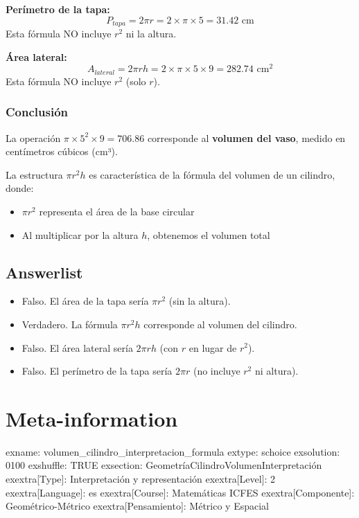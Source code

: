 \documentclass[
]{article}
\providecommand{\tightlist}{%
  \setlength{\itemsep}{0pt}\setlength{\parskip}{0pt}}
\begin{document}
\textbf{Perímetro de la tapa:}
\[P_{tapa} = 2\pi r = 2 \times \pi \times  5  =  31.42  \text{ cm}\]
Esta fórmula NO incluye \(r^2\) ni la altura.

\textbf{Área lateral:}
\[A_{lateral} = 2\pi r h = 2 \times \pi \times  5  \times  9  =  282.74  \text{ cm}^2\]
Esta fórmula NO incluye \(r^2\) (solo \(r\)).

\subsubsection{Conclusión}\label{conclusiuxf3n}

La operación \(\pi \times 5^2 \times 9 = 706.86\) corresponde al
\textbf{volumen del vaso}, medido en centímetros cúbicos (cm³).

La estructura \(\pi r^2 h\) es característica de la fórmula del volumen
de un cilindro, donde:

\begin{itemize}
\tightlist
\item
  \(\pi r^2\) representa el área de la base circular
\item
  Al multiplicar por la altura \(h\), obtenemos el volumen total
\end{itemize}

\subsection{Answerlist}\label{answerlist-1}

\begin{itemize}
\tightlist
\item
  Falso. El área de la tapa sería \(\pi r^2\) (sin la altura).
\item
  Verdadero. La fórmula \(\pi r^2 h\) corresponde al volumen del
  cilindro.
\item
  Falso. El área lateral sería \(2\pi r h\) (con \(r\) en lugar de
  \(r^2\)).
\item
  Falso. El perímetro de la tapa sería \(2\pi r\) (no incluye \(r^2\) ni
  altura).
\end{itemize}

\section{Meta-information}\label{meta-information}

exname: volumen\_cilindro\_interpretacion\_formula extype: schoice
exsolution: 0100 exshuffle: TRUE exsection:
Geometría\textbar Cilindro\textbar Volumen\textbar Interpretación
exextra{[}Type{]}: Interpretación y representación exextra{[}Level{]}: 2
exextra{[}Language{]}: es exextra{[}Course{]}: Matemáticas ICFES
exextra{[}Componente{]}: Geométrico-Métrico exextra{[}Pensamiento{]}:
Métrico y Espacial
\end{document}
